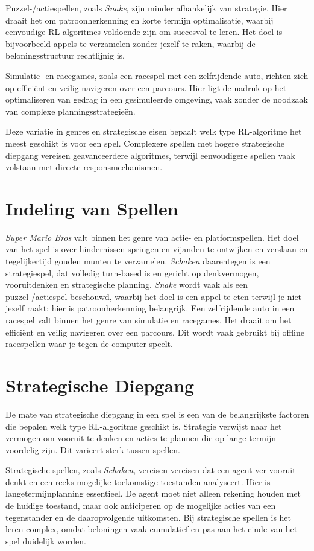 \documentclass[a4paper,12pt]{report}
\begin{document}
Puzzel-/actiespellen, zoals \textit{Snake}, zijn minder afhankelijk van
strategie. Hier draait het om patroonherkenning en korte termijn optimalisatie,
waarbij eenvoudige RL-algoritmes voldoende zijn om succesvol te leren. Het doel
is bijvoorbeeld appels te verzamelen zonder jezelf te raken, waarbij de
beloningsstructuur rechtlijnig is.

Simulatie- en racegames, zoals een racespel met een zelfrijdende auto, richten
zich op efficiënt en veilig navigeren over een parcours. Hier ligt de nadruk op
het optimaliseren van gedrag in een gesimuleerde omgeving, vaak zonder de
noodzaak van complexe planningsstrategieën.

Deze variatie in genres en strategische eisen bepaalt welk type RL-algoritme
het meest geschikt is voor een spel. Complexere spellen met hogere strategische
diepgang vereisen geavanceerdere algoritmes, terwijl eenvoudigere spellen vaak
volstaan met directe responsmechanismen.

\section{Indeling van Spellen}
\textit{Super Mario Bros} valt binnen het genre van actie- en platformspellen. Het doel van het spel is over hindernissen springen en vijanden te ontwijken en verslaan en tegelijkertijd gouden munten te verzamelen. \textit{Schaken} daarentegen is een strategiespel, dat volledig turn-based is en gericht op denkvermogen, vooruitdenken en strategische planning. \textit{Snake} wordt vaak als een puzzel-/actiespel beschouwd, waarbij het doel is een appel te eten terwijl je niet jezelf raakt; hier is patroonherkenning belangrijk. Een zelfrijdende auto in een racespel valt binnen het genre van simulatie en racegames. Het draait om het efficiënt en veilig navigeren over een parcours. Dit wordt vaak gebruikt bij offline racespellen waar je tegen de computer speelt.

\section{Strategische Diepgang}
De mate van strategische diepgang in een spel is een van de belangrijkste
factoren die bepalen welk type RL-algoritme geschikt is. Strategie verwijst
naar het vermogen om vooruit te denken en acties te plannen die op lange
termijn voordelig zijn. Dit varieert sterk tussen spellen.

Strategische spellen, zoals \textit{Schaken}, vereisen vereisen dat een agent
ver vooruit denkt en een reeks mogelijke toekomstige toestanden analyseert.
Hier is langetermijnplanning essentieel. De agent moet niet alleen rekening
houden met de huidige toestand, maar ook anticiperen op de mogelijke acties van
een tegenstander en de daaropvolgende uitkomsten. Bij strategische spellen is
het leren complex, omdat beloningen vaak cumulatief en pas aan het einde van
het spel duidelijk worden.
\end{document}
